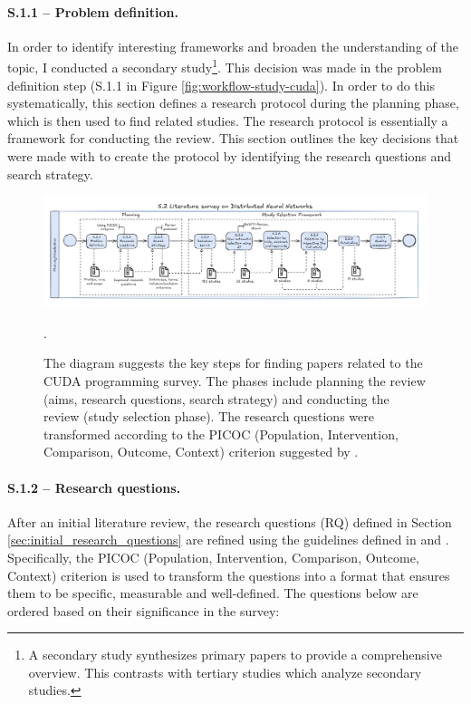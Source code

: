 \paragraph{S.1.1 -- Problem definition.}
In order to identify interesting frameworks and broaden the understanding of the topic, I conducted
a secondary study\footnote{A secondary study synthesizes primary papers to provide a comprehensive
	overview. This contrasts with tertiary studies which analyze secondary studies.}. This decision was
made in the problem definition step (S.1.1 in Figure \ref{fig:workflow-study-cuda}). In order to do this
systematically, this section defines a research protocol during the planning phase, which is then
used to find related studies. The research protocol is essentially a framework for conducting the
review. This section outlines the key decisions that were made with to create the protocol by
identifying the research questions and search strategy.

\begin{figure}[th]
	\centering
	\includegraphics[width=\linewidth]{figures/survey-cuda.pdf}
	\caption{The diagram suggests the key steps for finding papers related to the CUDA programming survey. The phases
		include planning the review (aims, research questions, search strategy) and conducting the review (study selection phase). The research questions
		were transformed according to the PICOC (Population, Intervention, Comparison, Outcome, Context) criterion suggested by \cite{keele_systematic_2007}.}.
	\label{fig:workflow-study-dnn}
\end{figure}

\paragraph{S.1.2 -- Research questions.}
After an initial literature review, the research questions (RQ) defined in Section
\ref{sec:initial_research_questions} are refined using the guidelines defined in
\cite{kitchenham_evidence-based_2015} and \cite{keele_systematic_2007}. Specifically, the PICOC
(Population, Intervention, Comparison, Outcome, Context) criterion is used to transform the
questions into a format that ensures them to be specific, measurable and well-defined. The
questions below are ordered based on their significance in the survey:

